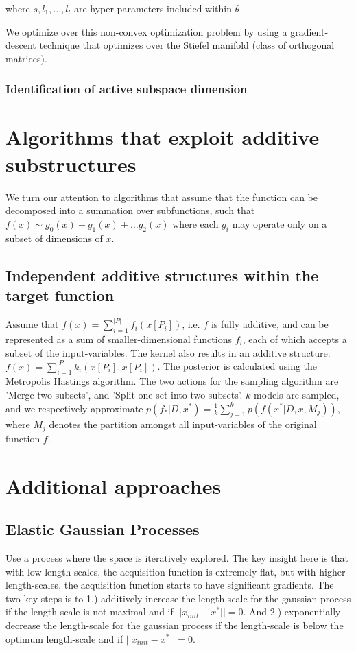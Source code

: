 where $s, l_1, \ldots, l_l $ are hyper-parameters included within $\theta$

We optimize over this non-convex optimization problem by using a gradient-descent technique that optimizes over the Stiefel manifold (class of orthogonal matrices).



\subsubsection{Identification of active subspace dimension }



\section{Algorithms that exploit additive substructures}

We turn our attention to algorithms that assume that the function can be decomposed into a summation over subfunctions, such that
$ f(x) \sim g_0(x) + g_1(x) + \ldots g_2(x) $ where each $g_i$ may operate only on a subset of dimensions of $x$.

\subsection{Independent additive structures within the target function}
\citep{Gardner2017} Assume that $f(x) = \sum_{i=1}^{ |P| } f_i (x[P_i] )$, i.e. $f$ is fully additive, and can be represented as a sum of smaller-dimensional functions $f_i$, each of which accepts a subset of the input-variables.
The kernel also results in an additive structure: $f(x) = \sum_{i=1}^{ |P| } k_i (x[P_i], x[P_i])$.
The posterior is calculated using the Metropolis Hastings algorithm.
The two actions for the sampling algorithm are 'Merge two subsets', and 'Split one set into two subsets'.
$k$ models are sampled, and we respectively approximate $p(f_* | D, x^*) = \frac{1}{k} \sum_{j=1}^{k} p( f(x^* | D, x, M_j) )$, where $M_j$ denotes the partition amongst all input-variables of the original function $f$.

\section{Additional approaches}

\subsection{Elastic Gaussian Processes}
\citep{Rana2017} Use a process where the space is iteratively explored.
The key insight here is that with low length-scales, the acquisition function is extremely flat, but with higher length-scales, the acquisition function starts to have significant gradients.
The two key-steps is to 1.) additively increase the length-scale for the gaussian process if the length-scale is not maximal and if $|| x_{init} - x^* || = 0$.
And 2.) exponentially decrease the length-scale for the gaussian process if the length-scale is below the optimum length-scale and if $|| x_{init} - x^* || = 0$.


